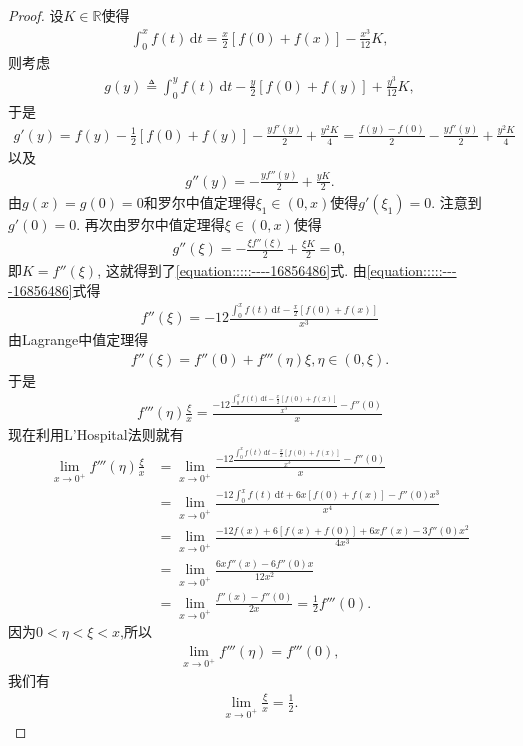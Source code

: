 \documentclass[../../main.tex]{subfiles}%
\begin{document}
\begin{proof}
设$K \in \mathbb{R}$使得
\begin{align*}
\int_0^x f(t) \,\mathrm{d}t = \frac{x}{2}[f(0) + f(x)] - \frac{x^3}{12}K,
\end{align*}
则考虑
\begin{align*}
g(y) \triangleq \int_0^y f(t) \,\mathrm{d}t - \frac{y}{2}[f(0) + f(y)] + \frac{y^3}{12}K,
\end{align*}
于是
\begin{align*}
g'(y) = f(y) - \frac{1}{2}[f(0) + f(y)] - \frac{y f'(y)}{2} + \frac{y^2 K}{4} = \frac{f(y) - f(0)}{2} - \frac{y f'(y)}{2} + \frac{y^2 K}{4}
\end{align*}
以及
\begin{align*}
g''(y) = -\frac{y f''(y)}{2} + \frac{y K}{2}.
\end{align*}
由$g(x) = g(0) = 0$和罗尔中值定理得$\xi_1 \in (0,x)$使得$g'(\xi_1) = 0$. 注意到$g'(0) = 0$. 再次由罗尔中值定理得$\xi \in (0,x)$使得
\begin{align*}
g''(\xi) = -\frac{\xi f''(\xi)}{2} + \frac{\xi K}{2} = 0,
\end{align*}
即$K = f''(\xi)$, 这就得到了\eqref{equation:::::----16856486}式.
由\eqref{equation:::::----16856486}式得
\begin{align*}
f''(\xi) = -12 \frac{\int_0^x f(t) \,\mathrm{d}t - \frac{x}{2}[f(0) + f(x)]}{x^3}
\end{align*}
由Lagrange中值定理得
\begin{align*}
f''(\xi) = f''(0) + f'''(\eta) \xi, \eta \in (0,\xi).
\end{align*}
于是
\begin{align*}
f'''(\eta) \frac{\xi}{x} = \frac{-12 \frac{\int_0^x f(t) \,\mathrm{d}t - \frac{x}{2}[f(0) + f(x)]}{x^3} - f''(0)}{x}
\end{align*}
现在利用L'Hospital法则就有
\begin{align*}
\lim_{x \to 0^+} f'''(\eta) \frac{\xi}{x} &= \lim_{x \to 0^+} \frac{-12 \frac{\int_0^x f(t) \,\mathrm{d}t - \frac{x}{2}[f(0) + f(x)]}{x^3} - f''(0)}{x} \\
&= \lim_{x \to 0^+} \frac{-12 \int_0^x f(t) \,\mathrm{d}t + 6x [f(0) + f(x)] - f''(0) x^3}{x^4} \\
&= \lim_{x \to 0^+} \frac{-12 f(x) + 6 [f(x) + f(0)] + 6x f'(x) - 3 f''(0) x^2}{4x^3} \\
&= \lim_{x \to 0^+} \frac{6x f''(x) - 6 f''(0) x}{12x^2} \\
&= \lim_{x \to 0^+} \frac{f''(x) - f''(0)}{2x} = \frac{1}{2} f'''(0).
\end{align*}
因为$0<\eta<\xi<x$,所以
\begin{align*}
\lim_{x \to 0^+} f'''(\eta) = f'''(0),
\end{align*}
我们有
\begin{align*}
\lim_{x \to 0^+} \frac{\xi}{x} = \frac{1}{2}.
\end{align*}
\end{proof}
\end{document}
